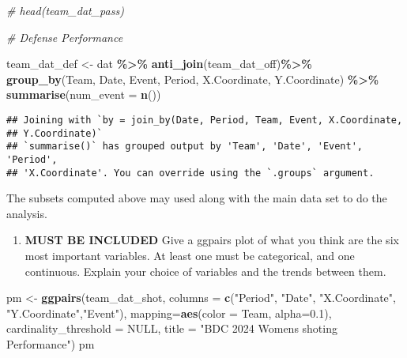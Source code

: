 \documentclass[
  a3paper,
]{article}
\newenvironment{Shaded}{\begin{snugshade}}{\end{snugshade}}
\newcommand{\AttributeTok}[1]{\textcolor[rgb]{0.13,0.29,0.53}{#1}}
\newcommand{\CommentTok}[1]{\textcolor[rgb]{0.56,0.35,0.01}{\textit{#1}}}
\newcommand{\ConstantTok}[1]{\textcolor[rgb]{0.56,0.35,0.01}{#1}}
\newcommand{\FloatTok}[1]{\textcolor[rgb]{0.00,0.00,0.81}{#1}}
\newcommand{\FunctionTok}[1]{\textcolor[rgb]{0.13,0.29,0.53}{\textbf{#1}}}
\newcommand{\NormalTok}[1]{#1}
\newcommand{\OtherTok}[1]{\textcolor[rgb]{0.56,0.35,0.01}{#1}}
\newcommand{\SpecialCharTok}[1]{\textcolor[rgb]{0.81,0.36,0.00}{\textbf{#1}}}
\newcommand{\StringTok}[1]{\textcolor[rgb]{0.31,0.60,0.02}{#1}}
\providecommand{\tightlist}{%
  \setlength{\itemsep}{0pt}\setlength{\parskip}{0pt}}
\begin{document}
\begin{Shaded}
\begin{Highlighting}[]
\CommentTok{\# head(team\_dat\_pass)}



\CommentTok{\# Defense Performance}

\NormalTok{team\_dat\_def }\OtherTok{\textless{}{-}}\NormalTok{ dat }\SpecialCharTok{\%\textgreater{}\%} 
  \FunctionTok{anti\_join}\NormalTok{(team\_dat\_off)}\SpecialCharTok{\%\textgreater{}\%} \FunctionTok{group\_by}\NormalTok{(Team, Date, Event, Period, X.Coordinate, Y.Coordinate) }\SpecialCharTok{\%\textgreater{}\%} \FunctionTok{summarise}\NormalTok{(}\AttributeTok{num\_event =} \FunctionTok{n}\NormalTok{())}
\end{Highlighting}
\end{Shaded}

\begin{verbatim}
## Joining with `by = join_by(Date, Period, Team, Event, X.Coordinate,
## Y.Coordinate)`
## `summarise()` has grouped output by 'Team', 'Date', 'Event', 'Period',
## 'X.Coordinate'. You can override using the `.groups` argument.
\end{verbatim}

The subsets computed above may used along with the main data set to do
the analysis.

\newpage

\vspace{2cm}

\begin{enumerate}
\def\labelenumi{\arabic{enumi})}
\setcounter{enumi}{1}
\tightlist
\item
  \textbf{MUST BE INCLUDED} Give a ggpairs plot of what you think are
  the six most important variables. At least one must be categorical,
  and one continuous. Explain your choice of variables and the trends
  between them.
\end{enumerate}

\begin{Shaded}
\begin{Highlighting}[]
\NormalTok{pm }\OtherTok{\textless{}{-}} \FunctionTok{ggpairs}\NormalTok{(team\_dat\_shot, }\AttributeTok{columns =} \FunctionTok{c}\NormalTok{(}\StringTok{"Period"}\NormalTok{, }\StringTok{"Date"}\NormalTok{, }\StringTok{"X.Coordinate"}\NormalTok{, }\StringTok{"Y.Coordinate"}\NormalTok{,}\StringTok{"Event"}\NormalTok{),  }\AttributeTok{mapping=}\FunctionTok{aes}\NormalTok{(}\AttributeTok{color =}\NormalTok{ Team, }\AttributeTok{alpha=}\FloatTok{0.1}\NormalTok{),}
              \AttributeTok{cardinality\_threshold =} \ConstantTok{NULL}\NormalTok{,}
  \AttributeTok{title =} \StringTok{"BDC 2024 Womens shoting Performance"}\NormalTok{)}
\NormalTok{pm}
\end{Highlighting}
\end{Shaded}
\end{document}
